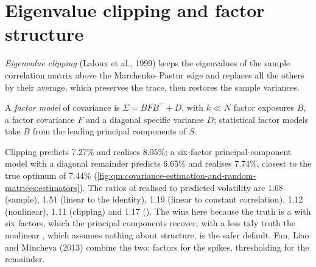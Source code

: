 \section{Eigenvalue clipping and factor structure}

\begin{definition}\label{def:qm:covariance-estimation-and-random-matrices:clip}
\emph{Eigenvalue clipping} (Laloux et al., 1999) keeps the eigenvalues of the sample correlation matrix above the Marchenko--Pastur edge and replaces all
the others by their average, which preserves the trace, then restores the sample variances.
\end{definition}

\begin{definition}\label{def:qm:covariance-estimation-and-random-matrices:factor}
A \emph{factor model} of covariance is $\Sigma = BF B^\top + D$, with $k \ll N$ factor exposures $B$, a factor covariance $F$ and a diagonal specific variance $D$; statistical
factor models take $B$ from the leading principal components of $S$.
\end{definition}

Clipping predicts 7.27\% and realises 8.05\%; a six-factor principal-component model with a diagonal remainder predicts 6.65\% and realises 7.74\%, closest to the true optimum of 7.44\%
(\cref{fig:qm:covariance-estimation-and-random-matrices:estimators}). The ratios of realised to predicted volatility are 1.68 (sample), 1.51 (linear to the identity), 1.19 (linear to
constant correlation), 1.12 (nonlinear), 1.11 (clipping) and 1.17 (). The  wins here because the truth is a  with six factors, which the principal
components recover; with a less tidy truth the nonlinear , which assumes nothing about structure, is the safer default. Fan, Liao and Mincheva (2013) combine the two: factors
for the spikes, thresholding for the remainder.

